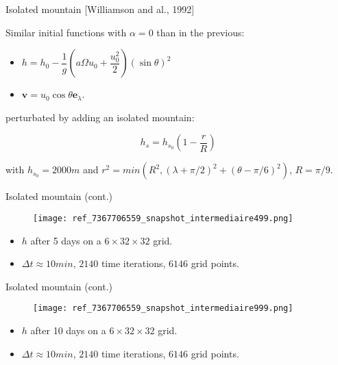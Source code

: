 \documentclass[11pt]{beamer}
\begin{document}

\begin{frame}{Isolated mountain [Williamson and al., 1992]}

Similar initial functions with $\alpha = 0$ than in the previous:

\begin{itemize}
\item $h = h_0 - \dfrac{1}{g} \left( a \Omega u_0 + \dfrac{u_0^2}{2} \right)(\sin \theta)^2$
\item $\mathbf{v} = u_0 \cos \theta \mathbf{e}_{\lambda}$.
\end{itemize}

perturbated by adding an isolated mountain:

$$h_s = h_{s_0} \left( 1 - \dfrac{r}{R} \right)$$

with $h_{s_0}=2000m$ and $r^2=min(R^2, (\lambda + \pi/2)^2+(\theta - \pi/6)^2)$, $R=\pi/9$.

\end{frame}



\begin{frame}{Isolated mountain (cont.)}
\begin{figure}
\texttt{[image: ref\_7367706559\_snapshot\_intermediaire499.png]}
\end{figure}
\begin{itemize}
\item $h$ after 5 days on a $6 \times 32 \times 32$ grid.
\item $\Delta t \approx 10min$, $2140$ time iterations, $6146$ grid points.
\end{itemize}
\end{frame}



\begin{frame}{Isolated mountain (cont.)}

\begin{figure}
\texttt{[image: ref\_7367706559\_snapshot\_intermediaire999.png]}
\end{figure}
\begin{itemize}
\item $h$ after 10 days on a $6 \times 32 \times 32$ grid.
\item $\Delta t \approx 10min$, $2140$ time iterations, $6146$ grid points.
\end{itemize}

\end{frame}
\end{document}
